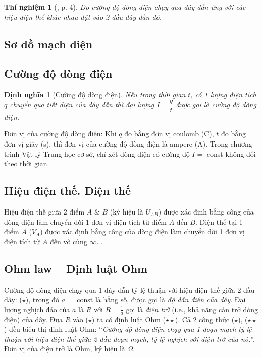 \documentclass{article}
\newtheorem{dinhnghia}{Định nghĩa}
\newtheorem{thinghiem}{Thí nghiệm}
\begin{document}
\begin{thinghiem}[\cite{SGK_Vat_Ly_9}, p. 4]
	Đo cường độ dòng điện chạy qua dây dẫn ứng với các hiệu điện thế khác nhau đặt vào 2 đầu dây dẫn đó.
\end{thinghiem}

\subsection{Sơ đồ mạch điện}

\subsection{Cường độ dòng điện}

\begin{dinhnghia}[Cường độ dòng điện]
	Nếu trong thời gian $t$, có 1 lượng điện tích $q$ chuyển qua tiết diện của dây dẫn thì đại lượng $I = \dfrac{q}{t}$ được gọi là \emph{cường độ dòng điện}.
\end{dinhnghia}
Đơn vị của cường độ dòng điện: Khi $q$ đo bằng đơn vị coulomb (C), $t$ đo bằng đơn vị giây (s), thì đơn vị của cường độ dòng điện là ampere (A). Trong chương trình Vật lý Trung học cơ sở, chỉ xét dòng điện có cường độ $I =$ const không đổi theo thời gian.

\subsection{Hiệu điện thế. Điện thế}
Hiệu điện thế giữa 2 điểm $A$ \& $B$ (ký hiệu là $U_{AB}$) được xác định bằng công của dòng điện làm chuyển dời 1 đơn vị điện tích từ điểm $A$ đến $B$. Điện thế tại 1 điểm $A$ ($V_A$) được xác định bằng công của dòng điện làm chuyển dời 1 đơn vị điện tích từ $A$ đến vô cùng $\infty$. .

\subsection{Ohm law -- Định luật Ohm}
Cường độ dòng điện chạy qua 1 dây dẫn tỷ lệ thuận với hiệu điện thế giữa 2 đầu dây:  ($\star$), trong đó $a =$ const là hằng số, được gọi là \emph{độ dẫn điện của dây}. Đại lượng nghịch đảo của $a$ là $R$ với $R = \frac{1}{a}$ gọi là \textit{điện trở} (i.e., khả năng cản trở dòng điện) của dây. Đưa $R$ vào ($\star$) ta có định luật Ohm  ($\star\star$). Cả 2 công thức ($\star$), ($\star\star$) đều biểu thị định luật Ohm: ``\textit{Cường độ dòng điện chạy qua 1 đoạn mạch tỷ lệ thuận với hiệu điện thế giữa 2 đầu đoạn mạch, tỷ lệ nghịch với điện trở của nó.}''. Đơn vị của điện trở là Ohm, ký hiệu là $\Omega$.
\end{document}
